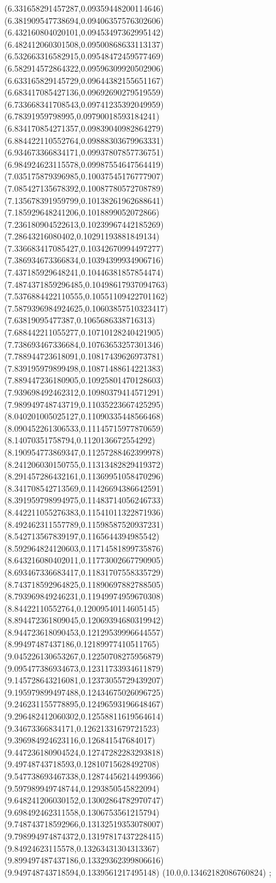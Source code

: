 {(6.331658291457287,0.09359448200114646)
(6.381909547738694,0.09406357576302606)
(6.432160804020101,0.09453497362995142)
(6.482412060301508,0.09500868633113137)
(6.532663316582915,0.09548472459577469)
(6.582914572864322,0.09596309920502906)
(6.633165829145729,0.09644382155651167)
(6.683417085427136,0.09692690279519559)
(6.733668341708543,0.09741235392049959)
(6.78391959798995,0.09790018593184241)
(6.834170854271357,0.09839040982864279)
(6.884422110552764,0.09888303679963331)
(6.934673366834171,0.09937807857736751)
(6.984924623115578,0.09987554647564419)
(7.035175879396985,0.10037545176777907)
(7.085427135678392,0.10087780572708789)
(7.135678391959799,0.10138261962688641)
(7.185929648241206,0.1018899052072866)
(7.236180904522613,0.10239967442185269)
(7.28643216080402,0.10291193881849134)
(7.336683417085427,0.10342670994497277)
(7.386934673366834,0.10394399934906716)
(7.437185929648241,0.10446381857854474)
(7.4874371859296485,0.10498617937094763)
(7.5376884422110555,0.10551109422701162)
(7.5879396984924625,0.10603857510323417)
(7.63819095477387,0.1065686338716313)
(7.688442211055277,0.10710128240421905)
(7.738693467336684,0.10763653257301346)
(7.788944723618091,0.10817439626973781)
(7.839195979899498,0.10871488614221383)
(7.889447236180905,0.10925801470128603)
(7.939698492462312,0.10980379414571291)
(7.989949748743719,0.11035223667425295)
(8.040201005025127,0.11090335448566468)
(8.090452261306533,0.11145715977870659)
(8.14070351758794,0.1120136672554292)
(8.190954773869347,0.11257288462399978)
(8.241206030150755,0.11313482829419372)
(8.291457286432161,0.11369951058470296)
(8.341708542713569,0.11426694386642591)
(8.391959798994975,0.11483714056246733)
(8.442211055276383,0.11541011322871936)
(8.492462311557789,0.11598587520937231)
(8.542713567839197,0.1165644394985542)
(8.592964824120603,0.11714581899735876)
(8.643216080402011,0.11773002667790905)
(8.693467336683417,0.11831707558335729)
(8.743718592964825,0.11890697882788505)
(8.793969849246231,0.11949974959670308)
(8.84422110552764,0.12009540114605145)
(8.894472361809045,0.12069394680319942)
(8.944723618090453,0.12129539996644557)
(8.99497487437186,0.12189977410511765)
(9.045226130653267,0.12250708275956879)
(9.095477386934673,0.12311733934611879)
(9.145728643216081,0.12373055729439207)
(9.195979899497488,0.12434675026096725)
(9.246231155778895,0.12496593196648467)
(9.296482412060302,0.12558811619564614)
(9.34673366834171,0.12621331679721523)
(9.396984924623116,0.126841547684017)
(9.447236180904524,0.12747282283293818)
(9.49748743718593,0.12810715628492708)
(9.547738693467338,0.12874456214499366)
(9.597989949748744,0.1293850545822094)
(9.648241206030152,0.13002864782970747)
(9.698492462311558,0.1306753561215794)
(9.748743718592966,0.13132519353078007)
(9.798994974874372,0.13197817437228415)
(9.84924623115578,0.13263431304313367)
(9.899497487437186,0.13329362399806616)
(9.949748743718594,0.1339561217495148)
(10.0,0.13462182086760824)
};
